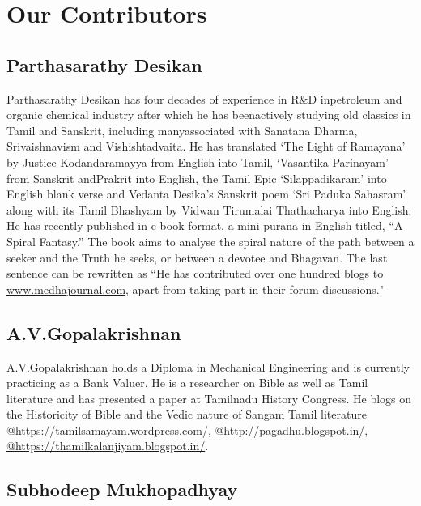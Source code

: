 
\chapter*{Our Contributors }\label{contributors}

\vskip 4pt

\section*{Parthasarathy Desikan}

\vskip 4pt

Parthasarathy Desikan has four decades of experience in R\&D in\break petroleum and organic chemical industry after which he has been\break actively studying old classics in Tamil and Sanskrit, including many\break associated with Sanatana Dharma, Srivaishnavism and Vishishtadvaita. He has translated `The Light of Ramayana' by Justice Kodandaramayya from English into Tamil, `Vasantika Parinayam' from Sanskrit and\break Prakrit into English, the Tamil Epic `Silappadikaram' into English blank verse and Vedanta Desika’s Sanskrit poem `Sri Paduka Sahasram' along with its Tamil Bhashyam by Vidwan Tirumalai Thathacharya into English. He has recently published in e book format, a mini-purana in English titled, “A Spiral Fantasy.” The book aims to analyse the spiral nature of the path between a seeker and the Truth he seeks, or between a devotee and Bhagavan. The last sentence can be rewritten as ``He has contributed over one hundred blogs to \url{www.medhajournal.com}, apart from taking part in their forum discussions."

\vskip 4pt

\section*{A.V.Gopalakrishnan}

\vskip 4pt

A.V.Gopalakrishnan holds a Diploma in Mechanical Engineering and is currently practicing as a Bank Valuer. He is a researcher on Bible as well as Tamil literature and has presented a paper at Tamilnadu History Congress. He blogs on the Historicity of Bible and the Vedic nature of Sangam Tamil literature \url{@https://tamilsamayam.wordpress.com/}, \url{@http://pagadhu.blogspot.in/}, \url{@https://thamilkalanjiyam.blogspot.in/}.

\section*{Subhodeep Mukhopadhyay}

